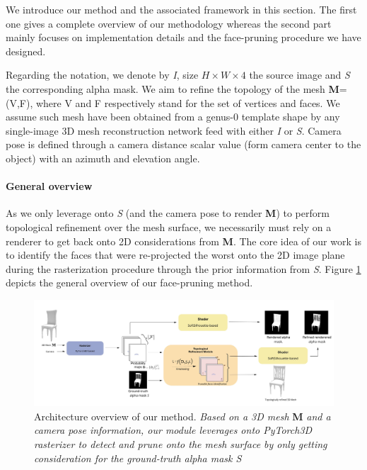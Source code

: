 We introduce our method and the associated framework in this section. The first one gives a complete overview of our methodology whereas the second part mainly focuses on implementation details and the face-pruning procedure we have designed. 

Regarding the notation, we denote by \textit{I}, size $H\times W \times 4$ the source image and \textit{S} the corresponding alpha mask. We aim to refine the topology of the mesh \textbf{M}=(V,F), where V and F respectively stand for the set of vertices and faces. We assume such mesh have been obtained from a genus-0 template shape by any single-image 3D mesh reconstruction network feed with either \textit{I} or \textit{S}. Camera pose is defined through a camera distance scalar value (form camera center to the object) with an azimuth and elevation angle. 

\paragraph{General overview}
As we only leverage onto \textit{S} (and the camera pose to render \textbf{M}) to perform topological refinement over the mesh surface, we necessarily must rely on a renderer to get back onto 2D considerations from  \textbf{M}. The core idea of our work is to identify the faces that were re-projected the worst onto the 2D image plane during the rasterization procedure through the prior information from \textit{S}. Figure \ref{fig:pipeline_overview} depicts the general overview of our face-pruning method.

\begin{figure}[htp!]
\begin{center}
\includegraphics[width=\linewidth]{images/adaptativesr/final_figure.jpg}
\end{center}
    \caption{Architecture overview of our method. \textit{Based on a 3D mesh} \textbf{M} \textit{and a camera pose information, our module leverages onto PyTorch3D rasterizer to detect and prune onto the mesh surface by only getting consideration for the ground-truth alpha mask S}}
\label{fig:pipeline_overview}
\end{figure}

